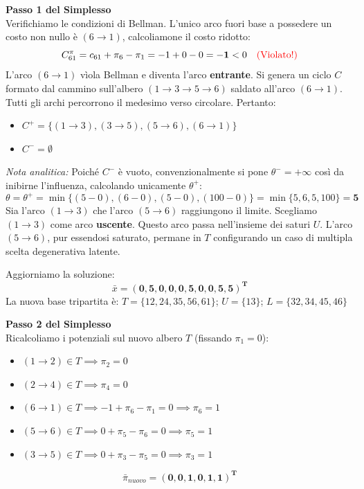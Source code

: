 \documentclass[12pt, a4paper]{article}
\begin{document}
	\textbf{Passo 1 del Simplesso}\\
	Verifichiamo le condizioni di Bellman. L'unico arco fuori base a possedere un costo non nullo è $(6\to1)$, calcoliamone il costo ridotto:
	\[ C^\pi_{61} = c_{61} + \pi_6 - \pi_1 = -1 + 0 - 0 = \mathbf{-1} < 0 \quad \text{\textcolor{red}{(Violato!)}} \]
	L'arco $(6\to1)$ vìola Bellman e diventa l'arco \textbf{entrante}. Si genera un ciclo $C$ formato dal cammino sull'albero $(1\to3\to5\to6)$ saldato all'arco $(6\to1)$. Tutti gli archi percorrono il medesimo verso circolare. Pertanto:
	\begin{itemize}
		\item $C^+ = \{ (1\to3), (3\to5), (5\to6), (6\to1) \}$
		\item $C^- = \emptyset$
	\end{itemize}
	\textit{Nota analitica:} Poiché $C^-$ è vuoto, convenzionalmente si pone $\theta^- = +\infty$ così da inibirne l'influenza, calcolando unicamente $\theta^+$:
	\[ \theta = \theta^+ = \min \{ (5-0), (6-0), (5-0), (100-0) \} = \min \{ 5, 6, 5, 100 \} = \mathbf{5} \]
	Sia l'arco $(1\to3)$ che l'arco $(5\to6)$ raggiungono il limite. Scegliamo $(1\to3)$ come arco \textbf{uscente}. Questo arco passa nell'insieme dei saturi $U$. L'arco $(5\to6)$, pur essendosi saturato, permane in $T$ configurando un caso di multipla scelta degenerativa latente.
	
	Aggiorniamo la soluzione:
	\[ \bar{x} = \mathbf{(0, \mathbf{5}, 0, 0, 0, \mathbf{5}, 0, 0, \mathbf{5}, \mathbf{5})^T} \]
	La nuova base tripartita è: 
	$T = \{12, 24, 35, 56, 61\}$; \quad $U = \{13\}$; \quad $L = \{32, 34, 45, 46\}$
	
	\vspace{0.4cm}
	\textbf{Passo 2 del Simplesso}\\
	Ricalcoliamo i potenziali sul nuovo albero $T$ (fissando $\pi_1 = 0$):
	\begin{itemize}
		\item $(1\to2) \in T \implies \pi_2 = 0$
		\item $(2\to4) \in T \implies \pi_4 = 0$
		\item $(6\to1) \in T \implies -1 + \pi_6 - \pi_1 = 0 \implies \pi_6 = 1$
		\item $(5\to6) \in T \implies 0 + \pi_5 - \pi_6 = 0 \implies \pi_5 = 1$
		\item $(3\to5) \in T \implies 0 + \pi_3 - \pi_5 = 0 \implies \pi_3 = 1$
	\end{itemize}
	\[ \bar{\pi}_{nuovo} = \mathbf{(0, 0, 1, 0, 1, 1)^T} \]
	
\end{document}

